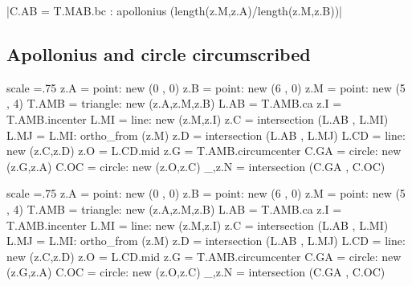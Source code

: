 |C.AB = T.MAB.bc : apollonius (length(z.M,z.A)/length(z.M,z.B))|



\subsection{Apollonius and circle circumscribed } %
\label{sub:apollonius_and_circle_circumscribed}

\begin{tkzexample}[latex=0cm,small,code only]
\begin{tkzelements}
   scale =.75
   z.A   = point: new (0 , 0)
   z.B   = point: new (6 , 0)
   z.M   = point: new (5 , 4)
   T.AMB = triangle: new (z.A,z.M,z.B)
   L.AB  = T.AMB.ca
   z.I   = T.AMB.incenter
   L.MI  = line: new (z.M,z.I)
   z.C   = intersection (L.AB , L.MI)
   L.MJ  = L.MI: ortho_from (z.M)
   z.D   = intersection (L.AB , L.MJ)
   L.CD  = line: new (z.C,z.D)
   z.O   = L.CD.mid
   z.G   = T.AMB.circumcenter
   C.GA  = circle: new (z.G,z.A)
   C.OC  = circle: new (z.O,z.C)
   _,z.N = intersection (C.GA , C.OC)
\end{tkzelements}
\end{tkzexample}


\begin{tkzelements}
   scale =.75
   z.A   = point: new (0 , 0)
   z.B   = point: new (6 , 0)
   z.M   = point: new (5 , 4)
   T.AMB = triangle: new (z.A,z.M,z.B)
   L.AB  = T.AMB.ca
   z.I   = T.AMB.incenter
   L.MI  = line: new (z.M,z.I)
   z.C   = intersection (L.AB , L.MI)
   L.MJ  = L.MI: ortho_from (z.M)
   z.D   = intersection (L.AB , L.MJ)
   L.CD  = line: new (z.C,z.D)
   z.O   = L.CD.mid
   z.G   = T.AMB.circumcenter
   C.GA  = circle: new (z.G,z.A)
   C.OC  = circle: new (z.O,z.C)
   _,z.N = intersection (C.GA , C.OC)
\end{tkzelements}

\hspace*{\fill}
\hspace*{\fill}

